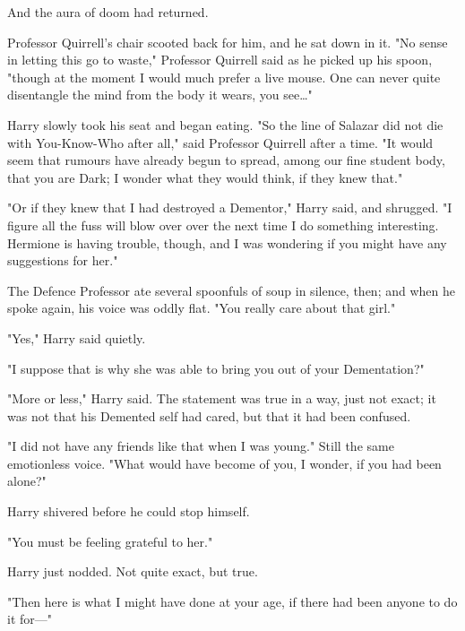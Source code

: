 And the aura of doom had returned.

Professor Quirrell's chair scooted back for him, and he sat down in it. "No
sense in letting this go to waste," Professor Quirrell said as he picked up his
spoon, "though at the moment I would much prefer a live mouse. One can never
quite disentangle the mind from the body it wears, you see…"

Harry slowly took his seat and began eating.
\later
"So the line of Salazar did not die with You-Know-Who after all," said
Professor Quirrell after a time. "It would seem that rumours have already begun
to spread, among our fine student body, that you are Dark; I wonder what they
would think, if they knew that."

"Or if they knew that I had destroyed a Dementor," Harry said, and shrugged. "I
figure all the fuss will blow over over the next time I do something
interesting. Hermione is having trouble, though, and I was wondering if you
might have any suggestions for her."

The Defence Professor ate several spoonfuls of soup in silence, then; and when
he spoke again, his voice was oddly flat. "You really care about that girl."

"Yes," Harry said quietly.

"I suppose that is why she was able to bring you out of your Dementation?"

"More or less," Harry said. The statement was true in a way, just not exact; it
was not that his Demented self had cared, but that it had been confused.

"I did not have any friends like that when I was young." Still the same
emotionless voice. "What would have become of you, I wonder, if you had been
alone?"

Harry shivered before he could stop himself.

"You must be feeling grateful to her."

Harry just nodded. Not quite exact, but true.

"Then here is what I might have done at your age, if there had been anyone to
do it for—"
